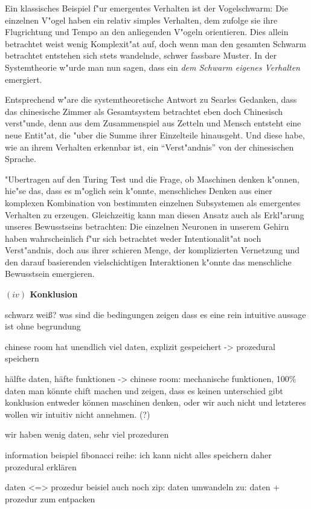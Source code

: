 \documentclass[a4paper, emulatestandardclasses, 12pt]{scrartcl}
\begin{document}
\begin{onehalfspace}
Ein klassisches Beispiel f"ur emergentes Verhalten ist der Vogelschwarm: Die einzelnen V"ogel haben ein relativ simples Verhalten, dem zufolge sie ihre Flugrichtung und Tempo an den anliegenden V"ogeln orientieren. Dies allein betrachtet weist wenig Komplexit"at auf, doch wenn man den gesamten Schwarm betrachtet entstehen sich stets wandelnde, schwer fassbare Muster. In der Systemtheorie w"urde man nun sagen, dass ein \emph{dem Schwarm eigenes Verhalten} emergiert.

Entsprechend w"are die systemtheoretische Antwort zu Searles Gedanken, dass das chinesische Zimmer als Gesamtsystem betrachtet eben doch Chinesisch verst"unde, denn aus dem Zusammenspiel aus Zetteln und Mensch entsteht eine neue Entit"at, die "uber die Summe ihrer Einzelteile hinausgeht. Und diese habe, wie an ihrem Verhalten erkennbar ist, ein "`Verst"andnis"' von der chinesischen Sprache.

"Ubertragen auf den Turing Test und die Frage, ob Maschinen denken k"onnen, hie"se das, dass es m"oglich sein k"onnte, menschliches Denken aus einer komplexen Kombination von bestimmten einzelnen Subsystemen als emergentes Verhalten zu erzeugen. Gleichzeitig kann man diesen Ansatz auch als Erkl"arung unseres Bewusstseins betrachten: Die einzelnen Neuronen in unserem Gehirn haben wahrscheinlich f"ur sich betrachtet weder Intentionalit"at noch Verst"andnis, doch aus ihrer schieren Menge, der komplizierten Vernetzung und den darauf basierenden vielschichtigen Interaktionen k"onnte das menschliche Bewusstsein emergieren.

\vspace{5mm}
\noindent\textbf{$(iv)$ Konklusion}

schwarz weiß?
was sind die bedingungen
zeigen dass es eine rein intuitive aussage ist ohne begrundung


chinese room hat unendlich viel daten, explizit gespeichert -> prozedural speichern

hälfte daten, häfte funktionen -> chinese room: mechanische funktionen, 100\% daten
man könnte chift machen und zeigen, dass es keinen unterschied gibt
konklusion entweder können maschinen denken, oder wir auch nicht und letzteres wollen wir intuitiv nicht annehmen. (?)

wir haben wenig daten, sehr viel prozeduren

information beispiel fibonacci reihe: ich kann nicht alles speichern daher prozedural erklären

daten <=> prozedur beisiel auch noch zip: daten umwandeln zu: daten + prozedur zum entpacken


\end{onehalfspace}
\end{document}
